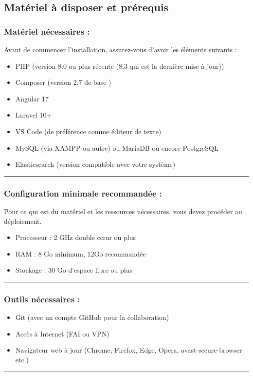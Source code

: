 \documentclass[12pt]{article}
\begin{document}
\subsection{Matériel à disposer et prérequis}

    \subsubsection{Matériel nécessaires :}
    
Avant de commencer l'installation, assurez-vous d'avoir les éléments suivants :
        \begin{itemize}[label=--]
            \item PHP (version 8.0 ou plus récente (8.3 qui est la dernière mise à jour))
            \item Composer (version 2.7 de base )
            \item Angular 17
            \item Laravel 10+
            \item VS Code (de préférence comme éditeur de texte)
            \item MySQL (via XAMPP ou autre) ou MariaDB ou encore PostgreSQL 
            \item Elasticsearch (version compatible avec votre système)
        \end{itemize}
    \rule{\linewidth}{0.2pt}
    \subsubsection{Configuration minimale recommandée :}

Pour ce qui est du matériel et les ressources nécessaires, vous devez procéder au déploiement.

        \begin{itemize}[label=--]
            \item Processeur : 2 GHz double cœur ou plus
            \item RAM : 8 Go minimum, 12Go recommandée
            \item Stockage : 30 Go d’espace libre ou plus
        \end{itemize}
    \rule{\linewidth}{0.2pt}
    \subsubsection{Outils nécessaires :}

        \begin{itemize}[label=--]
            \item Git (avec un compte GitHub pour la collaboration)
            \item Accès à Internet (FAI ou VPN)
            \item Navigateur web à jour (Chrome, Firefox, Edge, Opera, avast-secure-browser etc.)
        \end{itemize}
\rule{\linewidth}{0.2pt}
\end{document}
